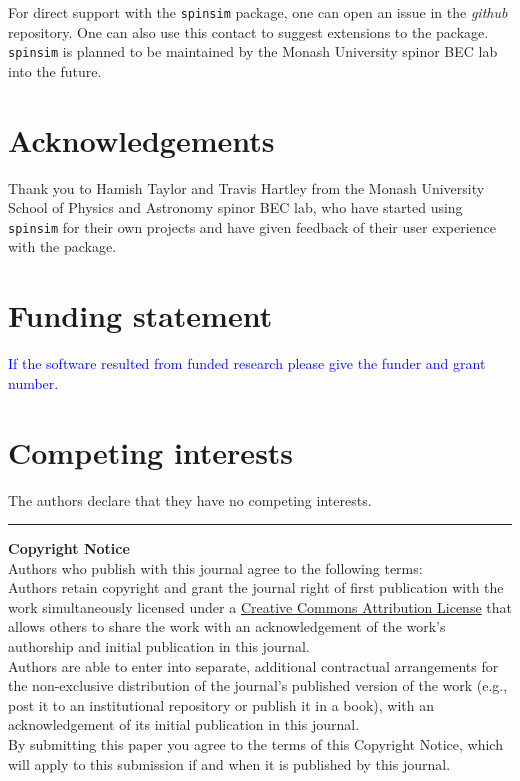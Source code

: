 \documentclass{jors}
\begin{document}
		For direct support with the \texttt{spinsim} package, one can open an issue in the \emph{github} repository. One can also use this contact to suggest extensions to the package. \texttt{spinsim} is planned to be maintained by the Monash University spinor BEC lab into the future.

\section*{Acknowledgements}

Thank you to Hamish Taylor and Travis Hartley from the Monash University School of Physics and Astronomy spinor BEC lab, who have started using \texttt{spinsim} for their own projects and have given feedback of their user experience with the package.

\section*{Funding statement}

\textcolor{blue}{If the software resulted from funded research please give the funder and grant number.}

\section*{Competing interests}

The authors declare that they have no competing interests.

{}


\vspace{2cm}

\rule{\textwidth}{1pt}

{ \bf Copyright Notice} \\
Authors who publish with this journal agree to the following terms: \\

Authors retain copyright and grant the journal right of first publication with the work simultaneously licensed under a  \href{http://creativecommons.org/licenses/by/3.0/}{Creative Commons Attribution License} that allows others to share the work with an acknowledgement of the work's authorship and initial publication in this journal. \\

Authors are able to enter into separate, additional contractual arrangements for the non-exclusive distribution of the journal's published version of the work (e.g., post it to an institutional repository or publish it in a book), with an acknowledgement of its initial publication in this journal. \\

By submitting this paper you agree to the terms of this Copyright Notice, which will apply to this submission if and when it is published by this journal.
\end{document}
